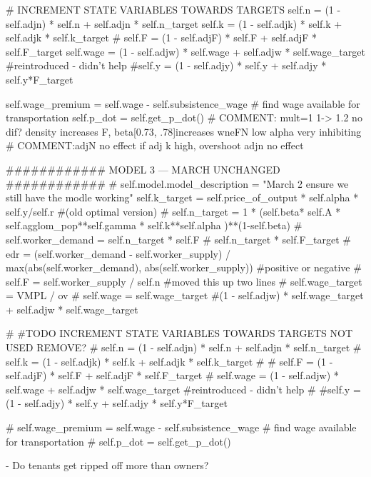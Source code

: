         # INCREMENT STATE VARIABLES TOWARDS TARGETS 
        self.n        = (1 - self.adjn) * self.n + self.adjn * self.n_target
        self.k        = (1 - self.adjk) * self.k + self.adjk * self.k_target 
        # self.F        = (1 - self.adjF) * self.F + self.adjF * self.F_target
        self.wage     = (1 - self.adjw) * self.wage + self.adjw * self.wage_target  #reintroduced  - didn't help
        #self.y        = (1 - self.adjy) * self.y + self.adjy * self.y*F_target 

        self.wage_premium     = self.wage - self.subsistence_wage # find wage available for transportation
        self.p_dot            = self.get_p_dot()
        # COMMENT: mult=1 1-> 1.2 no dif? density increases F, beta[0.73, .78]increases wneFN low alpha very inhibiting
        # COMMENT:adjN no effect if adj k high, overshoot adjn no effect


     ############   MODEL 3  --- MARCH UNCHANGED    ############ 
        #  self.model.model_description = "March 2 ensure we still have the modle working"        self.k_target = self.price_of_output * self.alpha * self.y/self.r     #(old optimal version)
        # self.n_target   = 1 * (self.beta* self.A * self.agglom_pop**self.gamma *  self.k**self.alpha )**(1-self.beta) 
        # self.worker_demand = self.n_target * self.F # self.n_target * self.F_target
        # edr = (self.worker_demand - self.worker_supply) / max(abs(self.worker_demand), abs(self.worker_supply)) #positive or negative 
        # self.F = self.worker_supply / self.n  #moved this up two lines
        # self.wage_target =  VMPL / ov
        # self.wage        = self.wage_target  #(1 - self.adjw) * self.wage_target + self.adjw * self.wage_target
        
        # #TODO INCREMENT STATE VARIABLES TOWARDS TARGETS     NOT USED  REMOVE?
        # self.n        = (1 - self.adjn) * self.n + self.adjn * self.n_target
        # self.k        = (1 - self.adjk) * self.k + self.adjk * self.k_target 
        # # self.F        = (1 - self.adjF) * self.F + self.adjF * self.F_target
        # self.wage     = (1 - self.adjw) * self.wage + self.adjw * self.wage_target  #reintroduced  - didn't help
        # #self.y        = (1 - self.adjy) * self.y + self.adjy * self.y*F_target 

        # self.wage_premium     = self.wage - self.subsistence_wage # find wage available for transportation
        # self.p_dot            = self.get_p_dot()

    
- Do tenants get ripped off more than owners?



